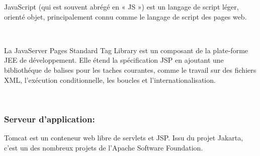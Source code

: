 \documentclass[a4paper]{report}
\begin{document}
\begin{spacing}{2}
\begin{minipage}{0.28\textwidth}
\begin{minipage}{\linewidth}
	\end{minipage}
\end{minipage}
\hfill
\begin{minipage}{0.75\textwidth}
	JavaScript (qui est souvent abrégé en « JS ») est un langage de script léger, orienté objet, principalement connu comme le langage de script des pages web.\\
\end{minipage}\vspace{0.5cm}\\
\begin{minipage}{0.2\textwidth}
	\begin{minipage}{\linewidth}
	\end{minipage}
\end{minipage}
\hfill
\begin{minipage}{0.75\textwidth}
	La JavaServer Pages Standard Tag Library est un composant de la plate-forme JEE de développement. Elle étend la spécification JSP en ajoutant une bibliothéque de balises pour les taches courantes, comme le travail sur des fichiers XML, l'exécution conditionnelle, les boucles et l'internationalisation.
\end{minipage}\vspace{0.5cm}\\
\subsubsection{Serveur d’application:}
\begin{minipage}{0.2\textwidth}
	\begin{minipage}{\linewidth}
	\end{minipage}
\end{minipage}
\hfill
\begin{minipage}{0.75\textwidth}
	Tomcat est un conteneur web libre de servlets et JSP. Issu du projet Jakarta, c'est un des nombreux projets de l’Apache Software Foundation.\\
\end{minipage}\\

\end{spacing}
\end{document}
